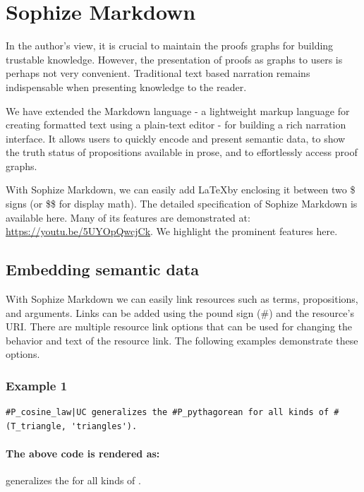 \documentclass[runningheads]{llncs}
\begin{document}
\section{Sophize Markdown}

In the author's view, it is crucial to maintain the proofs graphs for building trustable knowledge. However, the presentation of proofs as graphs to users is perhaps not very convenient. Traditional text based narration remains indispensable when presenting knowledge to the reader.

We have extended the Markdown language - a lightweight markup language for creating formatted text using a plain-text editor - for building a rich narration interface. It allows users to quickly encode and present semantic data, to show the truth status of propositions available in prose, and to effortlessly access proof graphs. 

With Sophize Markdown, we can easily add \LaTeX\space by enclosing it between two \$ signs (or \$\$ for display math). The detailed specification of Sophize Markdown is available here. Many of its features are demonstrated at: \url{https://youtu.be/5UYOpQwcjCk}. We highlight the prominent features here.

\subsection{Embedding semantic data}

With Sophize Markdown we can easily link resources such as terms, propositions, and arguments. Links can be added using the pound sign (\#) and the resource's URI. There are multiple resource link options that can be used for changing the behavior and text of the resource link. The following examples demonstrate these options.

\subsubsection*{Example 1}
\begin{verbatim}
#P_cosine_law|UC generalizes the #P_pythagorean for all kinds of #(T_triangle, 'triangles').
\end{verbatim}

\paragraph{The above code is rendered as:}
\begin{mdframed}
 generalizes the  for all kinds of .
\end{mdframed}
\end{document}
